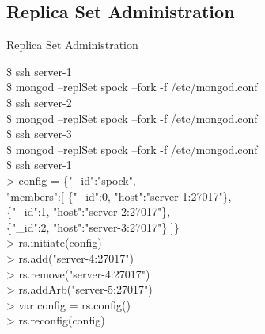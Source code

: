\documentclass{beamer}
\begin{document}
\subsection{Replica Set Administration}
\begin{frame}{Replica Set Administration}
    \scriptsize
    \begin{Alms*}
    	\$ ssh server-1 \\
    	\$ mongod --replSet spock --fork -f /etc/mongod.conf \\
    	\$ ssh server-2 \\
    	\$ mongod --replSet spock --fork -f /etc/mongod.conf \\
    	\$ ssh server-3 \\
    	\$ mongod --replSet spock --fork -f /etc/mongod.conf \\
    	
    	\$ ssh server-1 \\
    	> config = \{"\_id":"spock", \\
    	"members":[\NI
    	\{"\_id":0, "host":"server-1:27017"\}, \\
    	\{"\_id":1, "host":"server-2:27017"\}, \\
    	\{"\_id":2, "host":"server-3:27017"\}
    	\ND]\} \\
    	> rs.initiate(config) \\
    	> rs.add("server-4:27017") \\
    	> rs.remove("server-4:27017") \\
    	> rs.addArb("server-5:27017") \\
    	> var config = rs.config() \\
    	> rs.reconfig(config)
    	
    \end{Alms*}
\end{frame}
\end{document}
